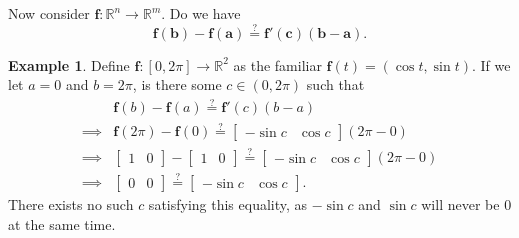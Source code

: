 \documentclass{article}
\newcommand{\R}{\mathbb{R}}
\newcommand{\f}{\mathbf{f}}
\theoremstyle{definition}
\newtheorem{example}{Example}[section]
\begin{document}
	Now consider $ \f:\R^n\to\R^m $. Do we have 
	$$\f(\mathbf b)-\f(\mathbf a)\stackrel{?}{=}\f'(\mathbf c)(\mathbf b - \mathbf a).$$ 
	\begin{example}
		Define $ \f:[0,2\pi]\to\R^2 $ as the familiar $ \f(t)=(\cos t, \sin t) $. If we let $ a = 0 $ and $ b = 2\pi $, is there some $ c\in (0, 2\pi ) $ such that 
		\begin{align*}
			& \f( b)-\f( a)\stackrel{?}{=}\f'( c)( b -  a)\\
			\implies &\f( 2\pi)-\f(0)\stackrel{?}{=}\begin{bmatrix}
				-\sin c & \cos c
			\end{bmatrix}(2\pi - 0)\\ \implies &\begin{bmatrix}
				1 & 0
			\end{bmatrix}-\begin{bmatrix}
				1 & 0
			\end{bmatrix}\stackrel{?}{=}\begin{bmatrix}
				-\sin c & \cos c
			\end{bmatrix}(2\pi - 0)\\  \implies &\begin{bmatrix}
				0 & 0 
			\end{bmatrix} \stackrel{?}{=} \begin{bmatrix}
				-\sin c & \cos c
			\end{bmatrix}.
		\end{align*}
		There exists no such $ c $ satisfying this equality, as $ -\sin c $ and $ \sin c $ will never be $ 0 $ at the same time. 
	\end{example}
	
\end{document}
